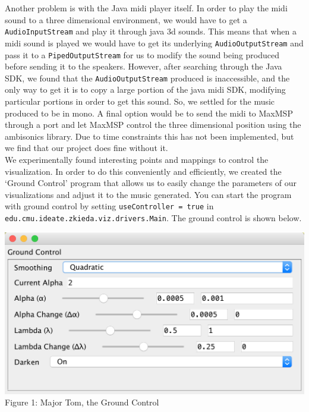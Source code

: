 \documentclass[11pt]{article}
\begin{document}
Another problem is with the Java midi player itself. In order to play the midi sound to a three dimensional environment, we would have to get a \verb|AudioInputStream| and play it through java 3d sounds. This means that when a midi sound is played we would have to get its underlying \verb|AudioOutputStream| and pass it to a \verb|PipedOutputStream| for us to modify the sound being produced before sending it to the speakers. However, after searching through the Java SDK, we found that the \verb|AudioOutputStream| produced is inaccessible, and the only way to get it is to copy a large portion of the java midi SDK, modifying particular portions in order to get this sound. So, we settled for the music produced to be in mono. A final option would be to send the midi to MaxMSP through a port and let MaxMSP control the three dimensional position using the ambisonics library. Due to time constraints this has not been implemented, but we find that our project does fine without it. \\

We experimentally found interesting points and mappings to control the visualization. In order to do this conveniently and efficiently, we created the `Ground Control' program that allows us to easily change the parameters of our visualizations and adjust it to the music generated. You can start the program with ground control by setting \verb|useController = true| in \verb|edu.cmu.ideate.zkieda.viz.drivers.Main|. The ground control is shown below.\\
\begin{center}
\includegraphics[width=\textwidth]{ground-control.png}\\
Figure 1: Major Tom, the Ground Control
\end{center}
\end{document}
